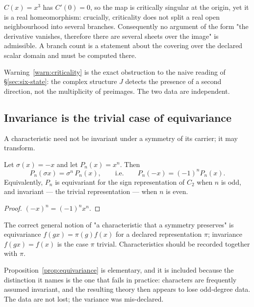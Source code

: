 \begin{warning}\label{warn:criticality}
$C(x)=x^{3}$ has $C'(0)=0$, so the map is critically singular at the origin, yet it is
a real homeomorphism: crucially, criticality does not split a real open neighbourhood
into several branches.  Consequently no argument of the form "the derivative vanishes,
therefore there are several sheets over the image" is admissible.  A branch count is a
statement about the covering over the declared scalar domain and must be computed
there.
\end{warning}

\begin{remark}
Warning~\ref{warn:criticality} is the exact obstruction to the naive reading of
\S\ref{sec:six-state}: the complex structure $J$ detects the presence of a
second direction, not the multiplicity of preimages.  The two data are independent.
\end{remark}

\subsection{Invariance is the trivial case of equivariance}

A characteristic need not be invariant under a symmetry of its carrier; it may
transform.

\begin{proposition}\label{prop:equivariance}
Let $\sigma(x)=-x$ and let $P_n(x)=x^{n}$.  Then
\[
  P_n(\sigma x)=\sigma^{n}\,P_n(x),\qquad\text{i.e.}\qquad P_n(-x)=(-1)^{n}P_n(x).
\]
Equivalently, $P_n$ is equivariant for the sign representation of $C_2$ when $n$ is odd,
and invariant --- the trivial representation --- when $n$ is even.
\end{proposition}

\begin{proof}
$(-x)^{n}=(-1)^{n}x^{n}$.
\end{proof}

\begin{proposal}\label{prop:equivariant-characteristics}
The correct general notion of "a characteristic that a symmetry preserves" is
equivariance $f(gx)=\pi(g)f(x)$ for a declared representation $\pi$; invariance
$f(gx)=f(x)$ is the case $\pi$ trivial.  Characteristics should be recorded together
with $\pi$.
\end{proposal}

\begin{remark}
Proposition~\ref{prop:equivariance} is elementary, and it is included because the
distinction it names is the one that fails in practice: characters are frequently
assumed invariant, and the resulting theory then appears to lose odd-degree data.  The
data are not lost; the variance was mis-declared.
\end{remark}

